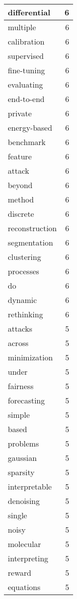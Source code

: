 \begin{table}[h]
\begin{tabular}{|l|r|}
\hline
differential & 6 \\
\hline
multiple & 6 \\
\hline
calibration & 6 \\
\hline
supervised & 6 \\
\hline
fine-tuning & 6 \\
\hline
evaluating & 6 \\
\hline
end-to-end & 6 \\
\hline
private & 6 \\
\hline
energy-based & 6 \\
\hline
benchmark & 6 \\
\hline
feature & 6 \\
\hline
attack & 6 \\
\hline
beyond & 6 \\
\hline
method & 6 \\
\hline
discrete & 6 \\
\hline
reconstruction & 6 \\
\hline
segmentation & 6 \\
\hline
clustering & 6 \\
\hline
processes & 6 \\
\hline
do & 6 \\
\hline
dynamic & 6 \\
\hline
rethinking & 6 \\
\hline
attacks & 5 \\
\hline
across & 5 \\
\hline
minimization & 5 \\
\hline
under & 5 \\
\hline
fairness & 5 \\
\hline
forecasting & 5 \\
\hline
simple & 5 \\
\hline
based & 5 \\
\hline
problems & 5 \\
\hline
gaussian & 5 \\
\hline
sparsity & 5 \\
\hline
interpretable & 5 \\
\hline
denoising & 5 \\
\hline
single & 5 \\
\hline
noisy & 5 \\
\hline
molecular & 5 \\
\hline
interpreting & 5 \\
\hline
reward & 5 \\
\hline
equations & 5 \\

\end{tabular}
\end{table}
